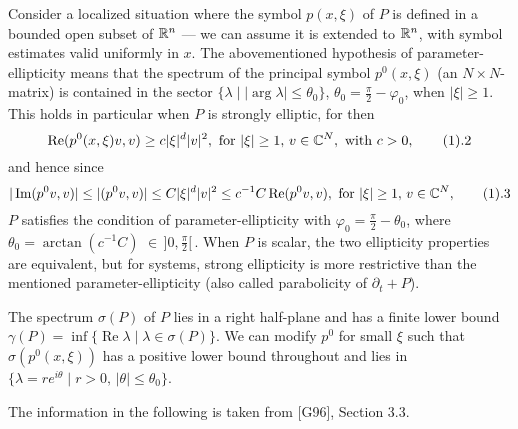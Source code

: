 Consider a localized situation where the symbol $p(x,\xi)$ of $P$ is defined in a bounded open
subset of ${\Bbb R}^n$ --- we can assume it is extended to
${\Bbb R}^n$, with symbol estimates valid
uniformly in $x$. The abovementioned hypothesis of parameter-ellipticity means that
the spectrum of the principal symbol $p^0(x,\xi)$ (an $N\times N$-matrix) is contained in the
sector $\{\lambda \mid |\arg\lambda |\le \theta _0\}$, $\theta _0=\frac\pi 2-\varphi _0$, when $|\xi |\ge
1$. This holds in particular when $P$ is strongly elliptic, for then
$$
\operatorname{Re}(p^0(x,\xi)v,v)\ge c|\xi|^d|v|^2, \text{ for
}|\xi|\ge 1,\, v\in{\Bbb C}^N,
\text{ with }c>0, \tag1.2
$$
and hence since
$$
|\operatorname{Im}(p^0v,v)|\le |(p^0v,v)|\le C|\xi|^d|v|^2\le
c^{-1}C\operatorname{Re}(p^0v,v),\text{ for }|\xi|\ge 1,\, v\in{\Bbb C}^N,\tag1.3
$$
$P$ satisfies the condition of  parameter-ellipticity with $\varphi _0=\frac\pi 2-\theta _0$,
where  $\theta _0=\arctan (c^{-1}C)$ \linebreak$\in \,]0,\frac\pi 2[\,$. When $P$
is scalar, the two ellipticity properties are equivalent, but for systems, strong
ellipticity is more restrictive than the mentioned parameter-ellipticity (also
called parabolicity of $\partial_t+P$).

The spectrum $\sigma (P)$ of $P$ lies in a right half-plane and has a finite lower
bound
$\gamma (P)=\inf\{\operatorname{Re}\lambda \mid \lambda \in \sigma (P)\}$.
We can modify $p^0$ for small $\xi$ such that $\sigma (p^0(x,\xi))$ has a positive lower bound
throughout and lies in $
\{\lambda =re^{i\theta }\mid r>0,\, |\theta |\le\theta _0\}$.

The information in the following is taken from [G96], Section 3.3.

